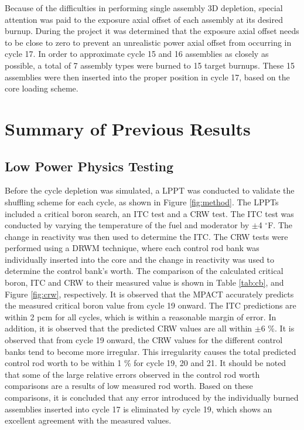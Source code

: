 \documentclass[edeposit,fullpage,12pt]{uiucthesis2009}
\begin{document}
Because of the difficulties in performing single assembly 3D depletion, special attention was paid to the exposure axial offset of each assembly at its desired burnup. 
During the project it was determined that the exposure axial offset needs to be close to zero to prevent an unrealistic power axial offset from occurring in cycle 17. 
In order to approximate cycle 15 and 16 assemblies as closely as possible, a total of 7 assembly types were burned to 15 target burnups. 
These 15 assemblies were then inserted into the proper position in cycle 17, based on the core loading scheme.


\section{Summary of Previous Results}

\subsection{Low Power Physics Testing}
Before the cycle depletion was simulated, a \gls{LPPT} was conducted to validate the shuffling scheme for each cycle, as shown in Figure \ref{fig:method}.
The \gls{LPPT}s included a critical boron search, an \gls{ITC} test and a \gls{CRW} test. 
The \gls{ITC} test was conducted by varying the temperature of the fuel and moderator by $\pm$4 $^\circ$F. 
The change in reactivity was then used to determine the \gls{ITC}. 
The \gls{CRW} tests were performed using a \gls{DRWM} technique, where each control rod bank was individually inserted into the core and the change in reactivity was used to determine the control bank's worth. 
The comparison of the calculated critical boron, \gls{ITC} and \gls{CRW} to their measured value is shown in Table \ref{tab:cb}, and Figure \ref{fig:crw}, respectively. 
It is observed that the MPACT accurately predicts the measured critical boron value from cycle 19 onward.
The \gls{ITC} predictions are within 2 pcm for all cycles, which is within a reasonable margin of error.
In addition, it is observed that the predicted \gls{CRW} values are all within $\pm6$ \%.
It is observed that from cycle 19 onward, the \gls{CRW} values for the different control banks tend to become more irregular.
This irregularity causes the total predicted control rod worth to be within 1 \% for cycle 19, 20 and 21. 
It should be noted that some of the large relative errors observed in the control rod worth comparisons are a results of low measured rod worth. 
Based on these comparisons, it is concluded that any error introduced by the individually burned assemblies inserted into cycle 17 is eliminated by cycle 19, which shows an excellent agreement with the measured values. 
\end{document}
